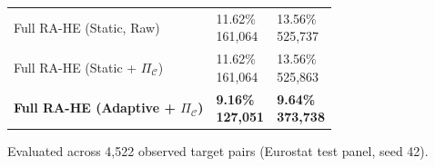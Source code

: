 \begin{table}[!t]
\begin{tabular}{>{\raggedright\arraybackslash}p{3.2cm}>{\centering\arraybackslash}p{2.3cm}>{\centering\arraybackslash}p{2.3cm}}
Full RA-HE (Static, Raw) & \shortstack{11.62\%\\{\scriptsize 161,064}} & \shortstack{13.56\%\\{\scriptsize 525,737}} \\
Full RA-HE (Static + $\Pi_{\mathcal{C}}$) & \shortstack{11.62\%\\{\scriptsize 161,064}} & \shortstack{13.56\%\\{\scriptsize 525,863}} \\
\textbf{Full RA-HE (Adaptive + $\Pi_{\mathcal{C}}$)} & \shortstack{\textbf{9.16\%}\\{\scriptsize \textbf{127,051}}} & \shortstack{\textbf{9.64\%}\\{\scriptsize \textbf{373,738}}} \\
\bottomrule
\end{tabular}
\par\vspace{2pt}
\scriptsize\raggedright 
Evaluated across 4,522 observed target pairs (Eurostat test panel, seed 42).

\vspace{8pt}


\end{table}
